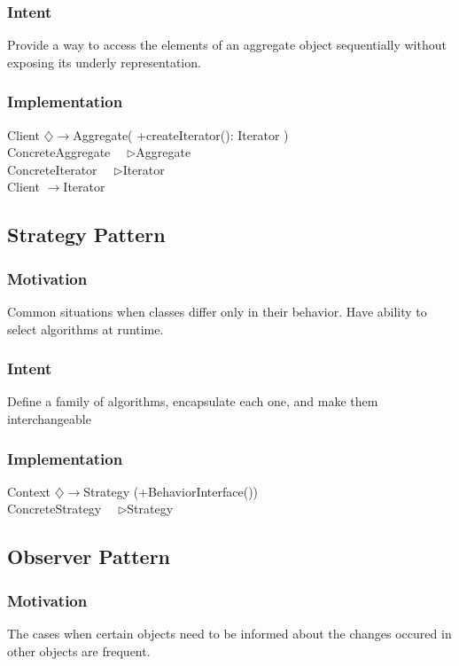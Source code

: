\documentclass[a4paper]{scrartcl}
\newcommand{\aggregates}{$\diamondsuit\rightarrow $}
\newcommand{\implements}{\textendash ~\textendash ~\textendash$\triangleright$}
\newcommand{\uses}{$\longrightarrow$}
\begin{document}
      \subsubsection { Intent }
        Provide a way to access the elements of an aggregate object sequentially without exposing its underly representation.
      \subsubsection { Implementation }
        Client \aggregates Aggregate( +createIterator(): Iterator )\\
        ConcreteAggregate \implements Aggregate\\
        ConcreteIterator \implements Iterator\\
        Client \uses Iterator\\
        
        
    \subsection { Strategy Pattern }
      \subsubsection {Motivation}
        Common situations when classes differ only in their behavior. Have ability to select algorithms at runtime.
      \subsubsection {Intent}
        Define a family of algorithms, encapsulate each one, and make them interchangeable
      \subsubsection { Implementation }
        Context \aggregates Strategy (+BehaviorInterface())\\
        ConcreteStrategy \implements Strategy\\
        
        
    \subsection{Observer Pattern}
      \subsubsection{Motivation}
        The cases when certain objects need to be informed about the changes occured in other objects are frequent.
\end{document}
